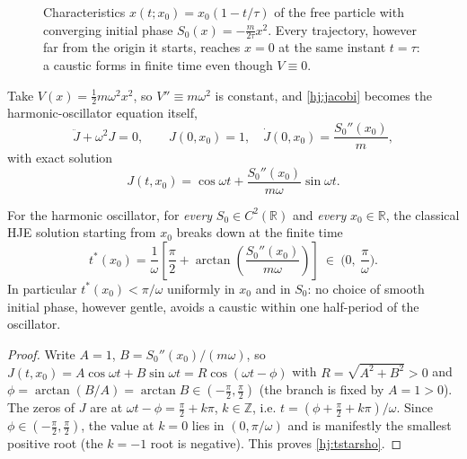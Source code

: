\begin{figure}[h]
\centering
{}
\caption{Characteristics $x(t;x_0)=x_0(1-t/\tau)$ of the free particle with
    converging initial phase $S_0(x)=-\frac{m}{2\tau}x^2$. Every trajectory,
    however far from the origin it starts, reaches $x=0$ at the same instant
    $t=\tau$: a caustic forms in finite time even though $V\equiv0$.}
\label{fig:focus}
\end{figure}

Take $V(x)=\tfrac12 m\omega^2x^2$, so $V''\equiv m\omega^2$ is constant, and
\eqref{hj:jacobi} becomes the harmonic-oscillator equation itself,
\[
\ddot J + \omega^2 J = 0, \qquad J(0,x_0)=1,\quad \dot J(0,x_0)=\frac{S_0''(x_0)}{m},
\]
with exact solution
\begin{equation}
J(t,x_0) = \cos\omega t + \frac{S_0''(x_0)}{m\omega}\sin\omega t.
\label{hj:Jsho}
\end{equation}

\begin{theorem}
\label{thm:sho}
For the harmonic oscillator, for \emph{every} $S_0\in C^2(\mathbb{R})$ and
    \emph{every} $x_0\in\mathbb{R}$, the classical HJE solution starting from
    $x_0$ breaks down at the finite time
\begin{equation}
t^\ast(x_0) = \frac{1}{\omega}\left[\frac{\pi}{2} + \arctan\!
    \left(\frac{S_0''(x_0)}{m\omega}\right)\right] \ \in\ \Big(0,\ 
    \frac{\pi}{\omega}\Big).
\label{hj:tstarsho}
\end{equation}
In particular $t^\ast(x_0) < \pi/\omega$ uniformly in $x_0$ and in $S_0$: 
    no choice of smooth initial phase, however gentle, avoids a caustic within one half-period of the oscillator.
\end{theorem}

\begin{proof}
Write $A=1$, $B=S_0''(x_0)/(m\omega)$, so $J(t,x_0)=A\cos\omega t+B\sin\omega t
    = R\cos(\omega t-\phi)$ with $R=\sqrt{A^2+B^2}>0$ and
    $\phi=\arctan(B/A)=\arctan B\in(-\tfrac\pi2,\tfrac\pi2)$ (the branch is
    fixed by $A=1>0$). The zeros of $J$ are at $\omega t-\phi=\tfrac\pi2+k\pi$,
    $k\in\mathbb Z$, i.e. $t=(\phi+\tfrac\pi2+k\pi)/\omega$. Since
    $\phi\in(-\tfrac\pi2,\tfrac\pi2)$, the value at $k=0$ lies in
    $(0,\pi/\omega)$ and is manifestly the smallest positive root (the $k=-1$
    root is negative). This proves \eqref{hj:tstarsho}.
\end{proof}

